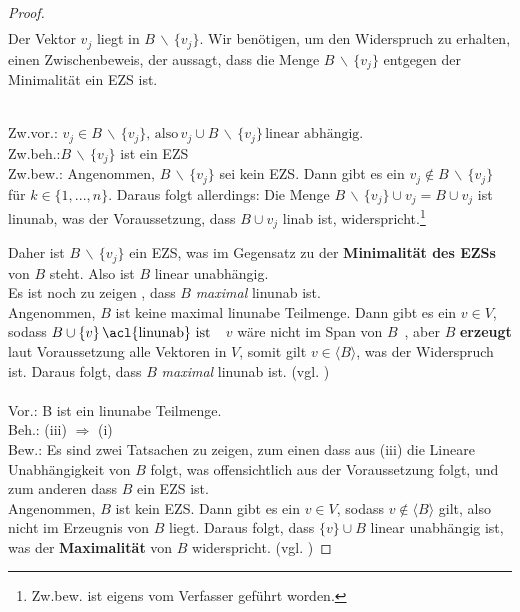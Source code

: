 \begin{proof}
\begin{align*}
\end{align*}
Der Vektor $v_j$ liegt in $B \, \backslash \, \{v_j\}$. Wir benötigen, um den Widerspruch zu erhalten, einen Zwischenbeweis, der aussagt, dass die Menge $B \, \backslash \, \{v_j\}$ entgegen der Minimalität ein \acl{EZS} ist.
\par
\begingroup
\leftskip=2cm
\noindent
\\Zw.vor.: \(v_j \in B \, \backslash \, \{v_j\}\text{, also} \, v_j \cup B \, \backslash \, \{v_j\} \, \text{linear abhängig.} \)
\\Zw.beh.:$B \, \backslash \, \{v_j\}$ ist ein \acl{EZS}
\\Zw.bew.: Angenommen, $B \, \backslash \, \{v_j\}$ sei kein \acl{EZS}. Dann gibt es ein $v_j \notin B \, \backslash \, \{v_j\}$ für $k\in\{1,...,n\}$. Daraus folgt allerdings: Die Menge $B \, \backslash \, \{v_j\} \cup v_j = B \cup {v_j} $ ist \acl{linunab}, was der Voraussetzung, dass $B \cup {v_j}$ \acl{linab} ist, widerspricht.\footnote{Zw.bew. ist eigens vom Verfasser geführt worden.}
\\ 
\par
\endgroup
Daher ist $B \, \backslash \, \{v_j\}$ ein \acl{EZS}, was im Gegensatz zu der \textbf{Minimalität des \acl{EZS}s} von $B$ steht. Also ist $B$ linear unabhängig.
\\Es ist noch zu zeigen , dass $B$ \emph{maximal} \acl{linunab} ist. 
\\Angenommen, $B$ ist keine maximal \acl{linunab}e Teilmenge.
Dann gibt es ein $v \in V$, sodass \( B \cup \{v\}\,\text{\acl{linunab} ist}\)\, \textendash \, $v$ wäre nicht im Span von $B$\, \textendash, aber $B$ \textbf{erzeugt} laut Voraussetzung alle Vektoren in $V$, somit gilt $v \in \langle B \rangle$, was der Widerspruch ist. Daraus folgt, dass $B$ \emph{maximal} \acl{linunab} ist. (vgl. \cite[S. 41, 9.16 (b) $\Rightarrow$ (c)]{Skript})
\\
\\ Vor.: B ist ein  \acl{linunab}e Teilmenge.
\\ Beh.: (iii) $\Rightarrow$ (i) 
\\ Bew.: Es sind zwei Tatsachen zu zeigen, zum einen dass aus (iii) die Lineare Unabhängigkeit von $B$ folgt, was offensichtlich aus der Voraussetzung folgt, und zum anderen dass $B$ ein \acl{EZS} ist. 
\\ Angenommen, $B$ ist kein \acl{EZS}. Dann gibt es ein $v \in V$, sodass $v \notin \langle B \rangle$ gilt, also nicht im Erzeugnis von $B$ liegt. Daraus folgt, dass $\{v\} \cup B$ linear unabhängig ist, was der \textbf{Maximalität} von $B$ widerspricht. (vgl. \cite[S. 59]{Beutel}) 
\end{proof}

